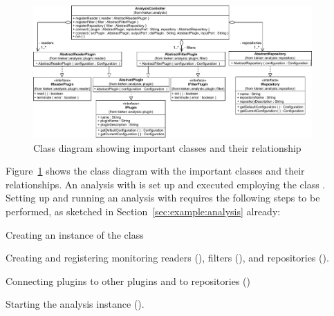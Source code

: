 
\begin{figure}\centering
\includegraphics[width=0.95\textwidth]{images/kieker_AnalysisControlleruserguide-modified}
\caption{Class diagram showing important \KiekerAnalysisPart{} classes and their relationship}
\label{fig:analysisController:classdiagram}
\end{figure}

\pagebreak

\noindent Figure~\ref{fig:analysisController:classdiagram} shows the class diagram %
with the important \KiekerAnalysisPart{} classes and their relationships. %
An analysis with \KiekerAnalysisPart{} is set up and executed employing %
the class . %
Setting up and running an analysis with \KiekerAnalysisPart{} requires the %
following steps to be performed, as sketched in Section~\ref{sec:example:analysis} already:

\medskip

\begin{compactenum}
\item Creating an instance of the  class
\item Creating and registering monitoring readers (), 
filters (), and repositories ().
\item Connecting plugins to other plugins and to repositories ()
\item Starting the analysis instance ().
\end{compactenum}

\medskip

